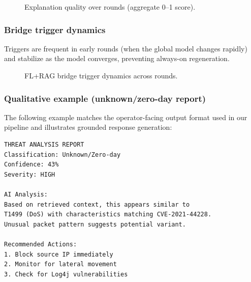 \begin{figure}[t]
\centering
{}
\caption{Explanation quality over rounds (aggregate 0--1 score).}
\label{fig:explanation_quality}
\end{figure}

\subsubsection{Bridge trigger dynamics}
Triggers are frequent in early rounds (when the global model changes rapidly) and stabilize as the model converges, preventing always-on regeneration.

\begin{figure}[t]
\centering
{}
\caption{FL+RAG bridge trigger dynamics across rounds.}
\label{fig:trigger_dynamics}
\end{figure}

\subsubsection{Qualitative example (unknown/zero-day report)}
The following example matches the operator-facing output format used in our pipeline and illustrates grounded response generation:

\begin{verbatim}
THREAT ANALYSIS REPORT
Classification: Unknown/Zero-day
Confidence: 43%
Severity: HIGH

AI Analysis:
Based on retrieved context, this appears similar to
T1499 (DoS) with characteristics matching CVE-2021-44228.
Unusual packet pattern suggests potential variant.

Recommended Actions:
1. Block source IP immediately
2. Monitor for lateral movement
3. Check for Log4j vulnerabilities
\end{verbatim}
